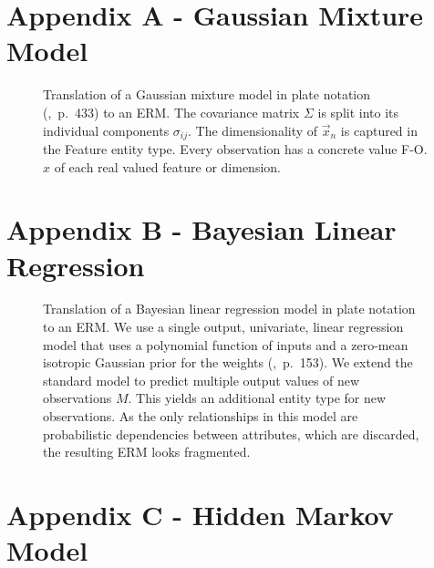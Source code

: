 \section*{Appendix A - Gaussian Mixture Model}

\vspace*{1em}
\begin{figure}[h!]
\centering
\scalebox{\tikzScale}{\adjustTikzSize }
\caption[Gaussian mixture model plate model to ERM translation]{Translation of a Gaussian mixture model in plate notation (\cite{bishop2006pattern},~p.~433) to an ERM. The covariance matrix $\Sigma$ is split into its individual components $\sigma_{ij}$. The dimensionality of $\vec x_n$ is captured in the Feature entity type. Every observation has a concrete value F-O.$x$ of each real valued feature or dimension.}\label{fig:gaussian_mixture}
\end{figure}

\newpage

\section*{Appendix B - Bayesian Linear Regression}

\vspace*{1em}
\begin{figure}[h!]
\centering
\scalebox{\tikzScale}{\adjustTikzSize }
\caption[Linear regression plate model to ERM translation]{Translation of a Bayesian linear regression model in plate notation to an ERM. We use a single output, univariate, linear regression model that uses a polynomial function of inputs and a zero-mean isotropic Gaussian prior for the weights (\cite{bishop2006pattern},~p.~153). We extend the standard model to predict multiple output values of new observations $M$. This yields an additional entity type for new observations. As the only relationships in this model are probabilistic dependencies between attributes, which are discarded, the resulting ERM looks fragmented.}\label{fig:bayesian_regression}
\end{figure}

\newpage

\section*{Appendix C - Hidden Markov Model}

